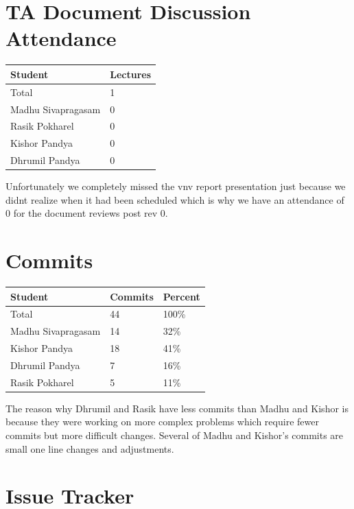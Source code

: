 \documentclass{article}
\begin{document}
\section{TA Document Discussion Attendance}


\begin{table}[H]
\centering
\begin{tabular}{ll}
\toprule
\textbf{Student} & \textbf{Lectures}\\
\midrule
Total & 1\\
Madhu Sivapragasam & 0\\
Rasik Pokharel & 0\\
Kishor Pandya & 0\\
Dhrumil Pandya & 0\\
\bottomrule
\end{tabular}
\end{table}

Unfortunately we completely missed the vnv report presentation just because we didnt realize when it had been scheduled which is why we have an attendance of 0 for the document reviews post rev 0. 

\section{Commits}


\begin{table}[H]
\centering
\begin{tabular}{lll}
\toprule
\textbf{Student} & \textbf{Commits} & \textbf{Percent}\\
\midrule
Total & 44 & 100\% \\
Madhu Sivapragasam & 14 & 32\% \\
Kishor Pandya & 18 & 41\% \\
Dhrumil Pandya & 7 & 16\% \\
Rasik Pokharel & 5 & 11\% \\
\bottomrule
\end{tabular}
\end{table}
The reason why Dhrumil and Rasik have less commits than Madhu and Kishor is because they were working on more complex problems which require fewer commits but more difficult changes. Several of Madhu and Kishor's commits are small one line changes and adjustments. 

\section{Issue Tracker}
\end{document}
